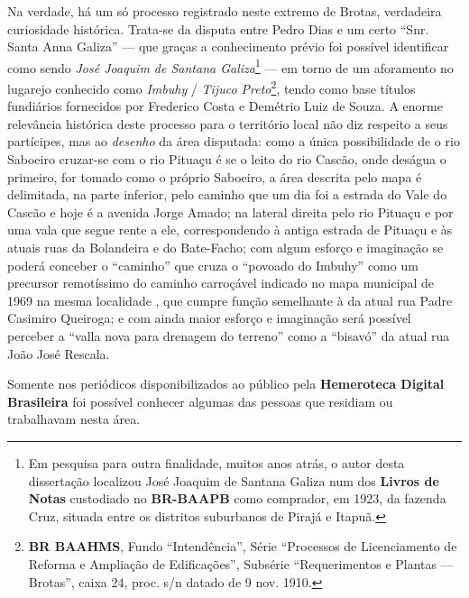 Na verdade, há um só processo registrado neste extremo de Brotas, verdadeira curiosidade histórica. Trata-se da disputa entre Pedro Dias e um certo ``Snr. Santa Anna Galiza'' --- que graças a conhecimento prévio foi possível identificar como sendo \textit{José Joaquim de Santana Galiza}\footnote{Em pesquisa para outra finalidade, muitos anos atrás, o autor desta dissertação localizou José Joaquim de Santana Galiza num dos \textbf{Livros de Notas} custodiado no \textbf{BR-BAAPB} como comprador, em 1923, da fazenda Cruz, situada entre os distritos suburbanos de Pirajá e Itapuã.} --- em torno de um aforamento no lugarejo conhecido como \textit{Imbuhy} / \textit{Tijuco Preto}\footnote{\textbf{BR BAAHMS}, Fundo ``Intendência'', Série ``Processos de Licenciamento de Reforma e Ampliação de Edificações'', Subsérie ``Requerimentos e Plantas --- Brotas'', caixa 24, proc. s/n datado de 9 nov. 1910.}, tendo como base títulos fundiários fornecidos por Frederico Costa e Demétrio Luiz de Souza. A enorme relevância histórica deste processo para o território local não diz respeito a seus partícipes, mas ao \textit{desenho} da área disputada: como a única possibilidade de o rio Saboeiro cruzar-se com o rio Pituaçu é se o leito do rio Cascão, onde deságua o primeiro, for tomado como o próprio Saboeiro, a área descrita pelo mapa é delimitada, na parte inferior, pelo caminho que um dia foi a estrada do Vale do Cascão \cite{salvador_mapa_1969} e hoje é a avenida Jorge Amado; na lateral direita pelo rio Pituaçu e por uma vala que segue rente a ele, correspondendo à antiga estrada de Pituaçu \cite{salvador_mapa_1969} e às atuais ruas da Bolandeira e do Bate-Facho; com algum esforço e imaginação se poderá conceber o ``caminho'' que cruza o ``povoado do Imbuhy'' como um precursor remotíssimo do caminho carroçável indicado no mapa municipal de 1969 na mesma localidade \cite{salvador_mapa_1969}, que cumpre função semelhante à da atual rua Padre Casimiro Queiroga; e com ainda maior esforço e imaginação será possível perceber a ``valla nova para drenagem do terreno'' como a ``bisavó'' da atual rua João José Rescala. 


Somente nos periódicos disponibilizados ao público pela \textbf{Hemeroteca Digital Brasileira} foi possível conhecer algumas das pessoas que residiam ou trabalhavam nesta área.


